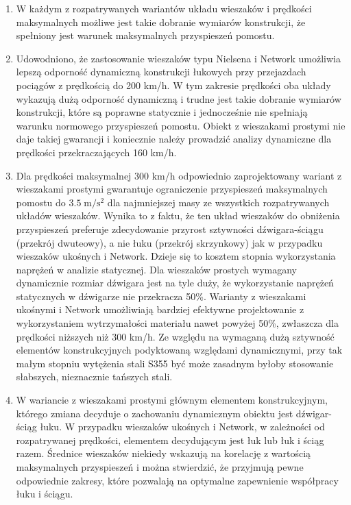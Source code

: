 \begin{enumerate}
	
\item W każdym z rozpatrywanych wariantów układu wieszaków i prędkości maksymalnych możliwe jest takie dobranie wymiarów konstrukcji, że spełniony jest warunek maksymalnych przyspieszeń pomostu.
	
\item Udowodniono, że zastosowanie wieszaków typu Nielsena i Network umożliwia lepszą odporność dynamiczną konstrukcji łukowych przy przejazdach pociągów z prędkością do 200 km/h. W tym zakresie prędkości oba układy wykazują dużą odporność dynamiczną i trudne jest takie dobranie wymiarów konstrukcji, które są poprawne statycznie i jednocześnie nie spełniają warunku normowego przyspieszeń pomostu. Obiekt z wieszakami prostymi nie daje takiej gwarancji i koniecznie należy prowadzić analizy dynamiczne dla prędkości przekraczających 160 km/h. 

\item Dla prędkości maksymalnej 300 km/h odpowiednio zaprojektowany wariant z wieszakami prostymi gwarantuje ograniczenie przyspieszeń maksymalnych pomostu do $3.5\;\mathrm{m/s^2}$ dla najmniejszej masy ze wszystkich rozpatrywanych układów wieszaków. Wynika to z faktu, że ten układ wieszaków do obniżenia przyspieszeń preferuje zdecydowanie przyrost sztywności dźwigara-ściągu (przekrój dwuteowy), a nie łuku (przekrój skrzynkowy) jak w przypadku wieszaków ukośnych i Network. Dzieje się to kosztem stopnia wykorzystania naprężeń w analizie statycznej. Dla wieszaków prostych wymagany dynamicznie rozmiar dźwigara jest na tyle duży, że wykorzystanie naprężeń statycznych w dźwigarze nie przekracza 50\%. Warianty z wieszakami ukośnymi i Network umożliwiają bardziej efektywne projektowanie z wykorzystaniem wytrzymałości materiału nawet powyżej 50\%, zwłaszcza dla prędkości niższych niż 300 km/h. Ze względu na wymaganą dużą sztywność elementów konstrukcyjnych podyktowaną względami dynamicznymi, przy tak małym stopniu wytężenia stali S355 być może zasadnym byłoby stosowanie słabszych, nieznacznie tańszych stali.

\item W wariancie z wieszakami prostymi głównym elementem konstrukcyjnym, którego zmiana decyduje o zachowaniu dynamicznym obiektu jest dźwigar-ściąg łuku. W przypadku wieszaków ukośnych i Network, w zależności od rozpatrywanej prędkości, elementem decydującym jest łuk lub łuk i ściąg razem. Średnice wieszaków niekiedy wskazują na korelację z wartością maksymalnych przyspieszeń i można stwierdzić, że przyjmują pewne odpowiednie zakresy, które pozwalają na optymalne zapewnienie współpracy łuku i ściągu.


\end{enumerate}
